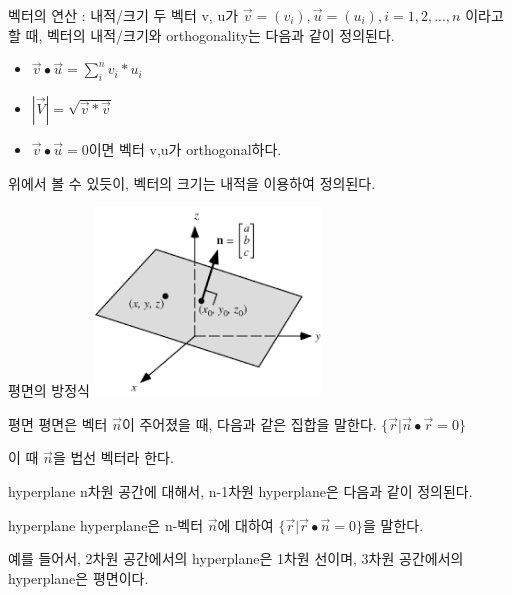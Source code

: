\documentclass{beamer}
\begin{document}
\begin{frame}{벡터의 연산 : 내적/크기} 
두 벡터 v, u가 $\vec{v} = (v_i), \vec{u} = (u_i), i = 1,2, ..., n$ 이라고 할 때, 벡터의 내적/크기와 orthogonality는 다음과 같이 정의된다. 

\begin{itemize} 
\item $ \vec{v} \bullet \vec{u} = \sum_{i}^{n} v_i * u_i $
\item $ |\vec{V}| = \sqrt{\vec{v} * \vec{v}} $ 
\item $ \vec{v} \bullet \vec{u} = 0 $이면 벡터 v,u가 orthogonal하다. 
\end{itemize}

위에서 볼 수 있듯이, 벡터의 크기는 내적을 이용하여 정의된다. 
\end{frame}

\begin{frame}{평면의 방정식} 
\includegraphics[height=5cm,keepaspectratio]{plane}
\begin{block}{평면}
평면은 벡터 $\vec{n}$이 주어졌을 때, 다음과 같은 집합을 말한다. $\{\vec{r}|\vec{n} \bullet \vec{r} = 0\}$
\end{block} 
이 때 $\vec{n}$을 법선 벡터라 한다. 
\end{frame}



\begin{frame}{hyperplane} 
n차원 공간에 대해서, n-1차원 hyperplane은 다음과 같이 정의된다. 
\begin{block}{hyperplane} 
hyperplane은 n-벡터 $\vec{n}$에 대하여 $\{\vec{r} | \vec{r} \bullet \vec{n} = 0\}$을 말한다. 
\end{block}

예를 들어서, 2차원 공간에서의 hyperplane은 1차원 선이며, 3차원 공간에서의 hyperplane은 평면이다. 
\end{frame}
\end{document}
